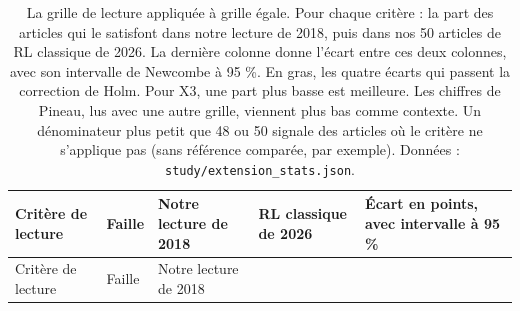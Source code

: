 \documentclass[11pt,a4paper]{article}
\begin{document}
\begin{longtable}[]{@{}
  >{\raggedright\arraybackslash}p{}
  >{\raggedright\arraybackslash}p{}
  >{\raggedleft\arraybackslash}p{}
  >{\raggedleft\arraybackslash}p{}
  >{\raggedleft\arraybackslash}p{}@{}}
\caption{La grille de lecture appliquée à grille égale. Pour chaque
critère : la part des articles qui le satisfont dans notre lecture de
2018, puis dans nos 50 articles de RL classique de 2026. La dernière
colonne donne l'écart entre ces deux colonnes, avec son intervalle de
Newcombe à 95 \%. En gras, les quatre écarts qui passent la correction
de Holm. Pour X3, une part plus basse est meilleure. Les chiffres de
Pineau, lus avec une autre grille, viennent plus bas comme contexte. Un
dénominateur plus petit que 48 ou 50 signale des articles où le critère
ne s'applique pas (sans référence comparée, par exemple). Données :
\texttt{study/extension\_stats.json}.}\tabularnewline
\toprule\noalign{}
\begin{minipage}[b]{\linewidth}\raggedright
Critère de lecture
\end{minipage} & \begin{minipage}[b]{\linewidth}\raggedright
Faille
\end{minipage} & \begin{minipage}[b]{\linewidth}\raggedleft
Notre lecture de 2018
\end{minipage} & \begin{minipage}[b]{\linewidth}\raggedleft
RL classique de 2026
\end{minipage} & \begin{minipage}[b]{\linewidth}\raggedleft
Écart en points, avec intervalle à 95 \%
\end{minipage} \\
\midrule\noalign{}
\endfirsthead
\toprule\noalign{}
\begin{minipage}[b]{\linewidth}\raggedright
Critère de lecture
\end{minipage} & \begin{minipage}[b]{\linewidth}\raggedright
Faille
\end{minipage} & \begin{minipage}[b]{\linewidth}\raggedleft
Notre lecture de 2018
\end{minipage} & \begin{minipage}[b]{\linewidth}\raggedleft

\end{minipage}
\end{longtable}
\end{document}
